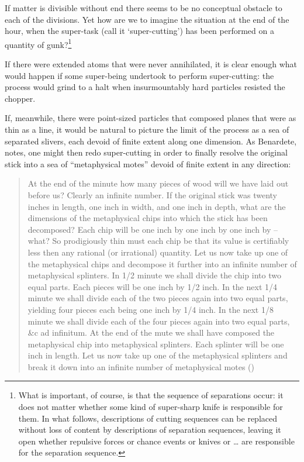 \documentclass[
  11pt,
  letterpaper,
  DIV=11,
  numbers=noendperiod,
  twoside]{scrartcl}
\begin{document}
If matter is divisible without end there seems to be no conceptual
obstacle to each of the divisions. Yet how are we to imagine the
situation at the end of the hour, when the super-task (call it
`super-cutting') has been performed on a quantity of gunk?\footnote{What
  is important, of course, is that the sequence of separations occur: it
  does not matter whether some kind of super-sharp knife is responsible
  for them. In what follows, descriptions of cutting sequences can be
  replaced without loss of content by descriptions of separation
  sequences, leaving it open whether repulsive forces or chance events
  or knives or \ldots{} are responsible for the separation sequence.}

If there were extended atoms that were never annihilated, it is clear
enough what would happen if some super-being undertook to perform
super-cutting: the process would grind to a halt when insurmountably
hard particles resisted the chopper.

If, meanwhile, there were point-sized particles that composed planes
that were as thin as a line, it would be natural to picture the limit of
the process as a sea of separated slivers, each devoid of finite extent
along one dimension. As Benardete, notes, one might then redo
super-cutting in order to finally resolve the original stick into a sea
of ``metaphysical motes'' devoid of finite extent in any direction:

\begin{quote}
At the end of the minute how many pieces of wood will we have laid out
before us? Clearly an infinite number. If the original stick was twenty
inches in length, one inch in width, and one inch in depth, what are the
dimensions of the metaphysical chips into which the stick has been
decomposed? Each chip will be one inch by one inch by one inch by --
what? So prodigiously thin must each chip be that its value is
certifiably less then any rational (or irrational) quantity. Let us now
take up one of the metaphysical chips and decompose it further into an
infinite number of metaphysical splinters. In 1/2 minute we shall divide
the chip into two equal parts. Each pieces will be one inch by 1/2 inch.
In the next 1/4 minute we shall divide each of the two pieces again into
two equal parts, yielding four pieces each being one inch by 1/4 inch.
In the next 1/8 minute we shall divide each of the four pieces again
into two equal parts, \&c ad infinitum. At the end of the mute we shall
have composed the metaphysical chip into metaphysical splinters. Each
splinter will be one inch in length. Let us now take up one of the
metaphysical splinters and break it down into an infinite number of
metaphysical motes ()
\end{quote}
\end{document}
